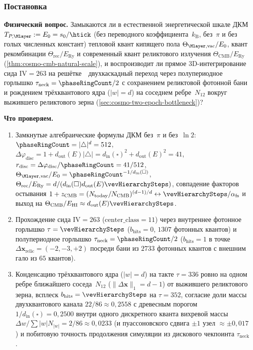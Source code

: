 \label{exp:cec04}

\subsubsection*{Постановка}
\textbf{Физический вопрос.}
Замыкаются ли в естественной энергетической шкале ДКМ $T_{P,\Mlayer} := E_0 = s_0/\htick$ (без переводного коэффициента~$k_{\mathrm{B}}$, без~$\pi$ и без голых численных констант) тепловой квант кипящего пола $\Theta_{\Mlayer,\mathrm{vac}}/E_0$, квант рекомбинации $\Theta_{\mathrm{rec}}/E_{\mathrm{Ry}}$ и современный квант реликтового излучения $\Theta_{\mathrm{CMB}}/E_{\mathrm{Ry}}$ (\cref{thm:cosmo-cmb-natural-scale}), и воспроизводит ли прямое 3D-интегрирование сида $\mathrm{IV}=263$ на решётке~\latGCKshort\ двухкаскадный переход через полупериодное горлышко $\tau_{\mathrm{neck}} = \phaseRingCount/2$ с сохранением реликтовой фотонной бани и рождением трёхквантового ядра ($|w|=d$) на соседнем ребре~$N_{12}$ вокруг выжившего реликтового зерна (\cref{sec:cosmo-two-epoch-bottleneck})?

\textbf{Что проверяем.}
\begin{enumerate}[label=\textbf{(\alph*)},leftmargin=*,itemsep=0.25em]
\item Замкнутые алгебраические формулы ДКМ без~$\pi$ и без~$\ln 2$: $\phaseRingCount = |\triangle|^d = 512$, $\Delta\varphi_{\mathrm{disc}} = 1 + d_{\mathrm{out}}(E)|\triangle| = d_{\mathrm{in}}(\square)^2 + d_{\mathrm{out}}(E)^2 = 41$, $r_{\mathrm{disc}} = \Delta\varphi_{\mathrm{disc}}/\phaseRingCount = 41/512$, $\Theta_{\Mlayer,\mathrm{vac}}/E_0 = \phaseRingCount^{-1/d_{\mathrm{in}}(\square)}$, $\Theta_{\mathrm{rec}}/E_{\mathrm{Ry}} = d/(d_{\mathrm{in}}(\square)d_{\mathrm{out}}(E)\vevHierarchySteps)$, совпадение факторов остывания $1+z_{\mathrm{CMB}} = (N_{\mathrm{today}}/N_{\mathrm{CMB}})^{(d-1)/d} \leftrightarrow \vevHierarchySteps/\alpha_{\mathrm{fs}}$ и выход на $\Theta_{\mathrm{CMB}}/E_{\mathrm{HI}} \approx d_{\mathrm{out}}(E)\vevHierarchySteps$.
\item Прохождение сида $\mathrm{IV}=263$ ($\mathrm{center\_class}=11$) через внутреннее фотонное горлышко $\tau=\vevHierarchySteps$ ($b_{\mathrm{hits}}=0$, $1307$ фотонных квантов) и полупериодное горлышко $\tau_{\mathrm{neck}}=\phaseRingCount/2$ ($b_{\mathrm{hits}}=1$ в точке $\Delta\mathbf{x}_{\mathrm{relic}}=(-2,-3,+2)$ посреди бани из $2733$ фотонных квантов с внешним гало из $65$ квантов).
\item Конденсацию трёхквантового ядра ($|w|=d$) на такте $\tau=336$ ровно на одном ребре ближайшего соседа~$N_{12}$ ($\|\Delta\mathbf{x}\|_1 = d-1$) от выжившего реликтового зерна, всплеск $b_{\mathrm{hits}}=\vevHierarchySteps$ на $\tau=352$, согласие доли массы двухквантового канала $22/86 \approx 0{,}2558$ с древесным порогом $1/d_{\mathrm{in}}(\square)=0{,}2500$ внутри одного дискретного кванта вихревой массы $\Delta w/\sum|w|N_{|w|} = 2/86 \approx 0{,}0233$ (и пуассоновского сдвига $\pm 1$ узел $\approx \pm 0{,}017$) и побитовую точность продолжения симуляции из дискового чекпоинта $\tau_{\mathrm{neck}}$.
\end{enumerate}

